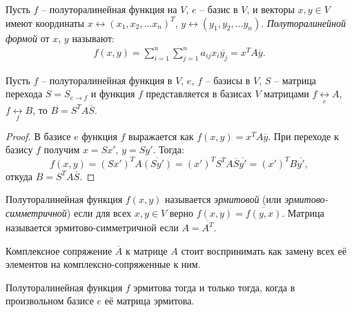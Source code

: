 \begin{definition}
    Пусть $f$ -- полуторалинейная функция на $V$, $e$ -- базис в $V$, и векторы $x, y \in V$ имеют 
    координаты $x \leftrightarrow (x_1, x_2, \dots x_n)^T$, $y \leftrightarrow (y_1, y_2, \dots y_n)$.
    \textit{Полуторалинейной формой} от $x$, $y$ называют:
    \begin{gather*}
        f(x, y) = \sum_{i=1}^{n} \sum_{j=1}^{n} a_{ij} x_i \overline{y_j} = x^T A \overline{y}.
    \end{gather*} 
\end{definition}

\begin{proposition}
    Пусть $f$ -- полуторалинейная функция в $V$, $e$, $f$ -- базисы в $V$, $S$ -- матрица перехода 
    $S = S_{e \to f}$ и функция $f$ представляется в базисах $V$ матрицами
    $f \underset{e}{\leftrightarrow} A$, $f  \underset{f}{\leftrightarrow} B$, то $B = S^T A \overline{S}$.
\end{proposition}

\begin{proof}
    В базисе $e$ функция $f$ выражается как $f(x, y) = x^T A \overline{y}$. При переходе к базису 
    $f$ получим $x = S x'$, $y =  S y'$. Тогда:
    $$f(x, y) = (Sx')^T A \overline{(Sy')} = (x')^T S^TA \overline{S} \overline{y'} = (x')^TB\overline{y'},$$
    откуда $B = S^TA\overline{S}$.
\end{proof}

\begin{definition}
    Полуторалинейная функция $f(x, y)$ называется \textit{эрмитовой} (или \textit{эрмитово-симметричной}) если для всех 
    $x, y \in V$ верно $f(x, y) = \overline{f(y, x)}$. Матрица называется эрмитово-симметричной если 
    $A = \overline{A^T}$. 
\end{definition}

\begin{note}
    Комплексное сопряжение $\overline{A}$ к матрице $A$ стоит воспринимать как замену всех её элементов 
    на комплексно-сопряженные к ним.
\end{note}

\begin{proposition}
    Полуторалинейная функция $f$ эрмитова тогда и только тогда, когда в произвольном базисе $e$ её 
    матрица эрмитова.
\end{proposition}

